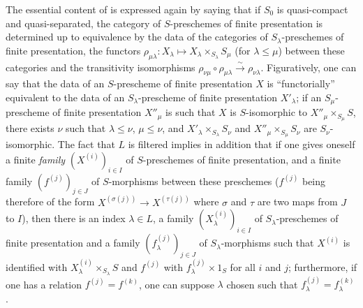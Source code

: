 \begin{scholium}[8.8.3]
\label{IV.8.8.3}
The essential content of  is expressed again by saying that if $S_0$ is quasi-compact and quasi-separated, the category of $S$-preschemes of finite presentation is determined up to equivalence by the data of the categories of $S_\lambda$-preschemes of finite presentation, the functors $\rho_{\mu\lambda}:X_\lambda\mapsto X_\lambda\times_{S_\lambda}S_\mu$ (for $\lambda\leqslant\mu$) between these categories and the transitivity isomorphisms $\rho_{\nu\mu}\circ\rho_{\mu\lambda}\xrightarrow{\sim}\rho_{\nu\lambda}$.
Figuratively, one can say that the data of an $S$-prescheme of finite presentation $X$ is ``functorially'' equivalent to the data of an $S_\lambda$-prescheme of finite presentation $X'_\lambda$; if an $S_\mu$-prescheme of finite presentation $X''_\mu$ is such that $X$ is $S$-isomorphic to $X''_\mu\times_{S_\mu}S$, there exists $\nu$ such that $\lambda\leqslant\nu$, $\mu\leqslant\nu$, and $X'_\lambda\times_{S_\lambda}S_\nu$ and $X''_\mu\times_{S_\mu}S_\nu$ are $S_\nu$-isomorphic.
The fact that $L$ is filtered implies in addition that if one gives oneself a finite \emph{family} $(X^{(i)})_{i\in I}$ of $S$-preschemes of finite presentation, and a finite family $(f^{(j)})_{j\in J}$ of $S$-morphisms between these preschemes ($f^{(j)}$ being therefore of the form $X^{(\sigma(j))}\to X^{(\tau(j))}$ where $\sigma$ and $\tau$ are two maps from $J$ to $I$), then there is an index $\lambda\in L$, a family $(X^{(i)}_\lambda)_{i\in I}$ of $S_\lambda$-preschemes of finite presentation and a family $(f^{(j)}_\lambda)_{j\in J}$ of $S_\lambda$-morphisms such that $X^{(i)}$ is identified with $X^{(i)}_\lambda\times_{S_\lambda}S$ and $f^{(j)}$ with $f^{(j)}_\lambda\times 1_S$ for all $i$ and $j$; furthermore, if one has a relation $f^{(j)}=f^{(k)}$, one can suppose $\lambda$ chosen such that $f^{(j)}_\lambda=f^{(k)}_\lambda$.


\end{scholium}
